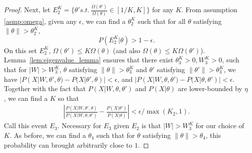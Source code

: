 \begin{proof}
Next, let $E^K_2 = \{\theta' s.t.\ \frac{\Omega(\theta')}{\Omega(\theta)}
\in [1/K,K] \}$ for any $K$. From assumption \ref{asmp:omega}, given any
$\epsilon$, we can find a $\theta^K_2$ such that for all $\theta$ satisfying $\| \theta \| > \theta^K_2$,
$$P(E^K_2 | \theta) > 1 - \epsilon .$$
On this set $E^K_2$, $\Omega(\theta') \le K \Omega(\theta)$ (and also
$\Omega(\theta) \le K \Omega(\theta')$).  Lemma~\ref{lem:eigenvalue_lemma}
ensures that %
there exist $\theta^K_3 > 0, W^K_3 > 0$, such that for $|W| > W^K_3$,
$\theta$ satisfying $ \| \theta \| > \theta^K_3$ and $\theta'$ satisfying $ \| \theta' \| > \theta^K_3$, we have
$|P(X | W, \theta' , \theta) - P(X | \theta' , \theta)| < \epsilon$, and
$|P(X | W, \theta , \theta') - P(X | \theta , \theta')| < \epsilon$.
Together with the fact that ${P(X | W, \theta , \theta')}$ and ${P(X | \theta)}$
are lower-bounded by $\eta$,
we can find a $K$ so that
\begin{align*}
|\frac{P(X | W, \theta' , \theta)}{P(X | W, \theta , \theta')} - \frac{P(X | \theta')}{P(X | \theta)}| < \epsilon / \max(K_2, 1).
\end{align*}
Call this event $E_3$. Necessary for $E_3$ given $E_2$ is that
$|W| > W^K_3$ for our choice of $K$. As before, we can find a $\theta_4$
such that for $\theta$ satisfying $ \| \theta \|  > \theta_4$, this probability can brought arbitrarily close to $1$.




\end{proof}

